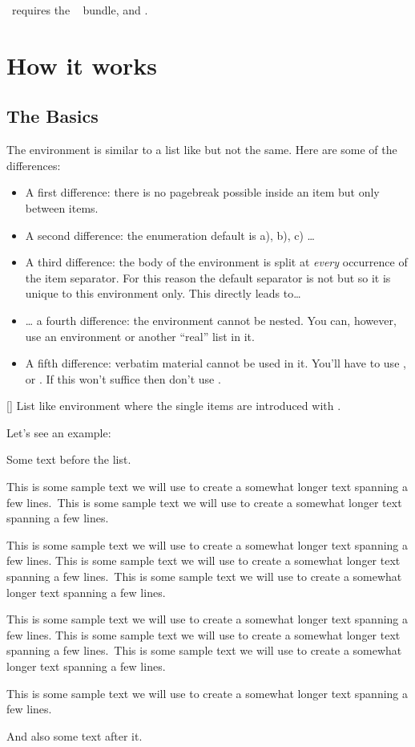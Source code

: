 \documentclass[load-preamble+]{cnltx-doc}
\newcommand*\sample{This is some sample text we will use to create a somewhat
  longer text spanning a few lines.}
\newcommand*\Sample{\sample\ \sample\par\sample}
\begin{document}
\Tasks\ requires the ~\cite{bnd:l3kernel} bundle,
 and .

\section{How it works}
\subsection{The Basics}
The  environment is similar to a list like  but not
the same.  Here are some of the differences:
\begin{itemize}
  \item A first difference: there is no pagebreak possible inside an item but
    only between items.
  \item A second difference: the enumeration default is a), b), c) \ldots
  \item A third difference: the body of the  environment is split
    at \emph{every} occurrence of the item separator.  For this reason the
    default separator is not  but  so it is unique to this
    environment only.  This directly leads to\ldots
  \item \ldots{} a fourth difference: the  environment cannot be
    nested.  You can, however, use an  environment or another
    \enquote{real} list in it.
  \item A fifth difference: verbatim material cannot be used in it.  You'll
    have to use ,  or .  If this
    won't suffice then don't use .
\end{itemize}

\begin{environments}
  []
    List like environment where the single items are introduced with
    .
\end{environments}
Let's see an example:
\begin{example}
  Some text before the list.
  \begin{tasks}
    \task \Sample
    \task \Sample
    \task \Sample
  \end{tasks}
  And also some text after it.
\end{example}
\end{document}
